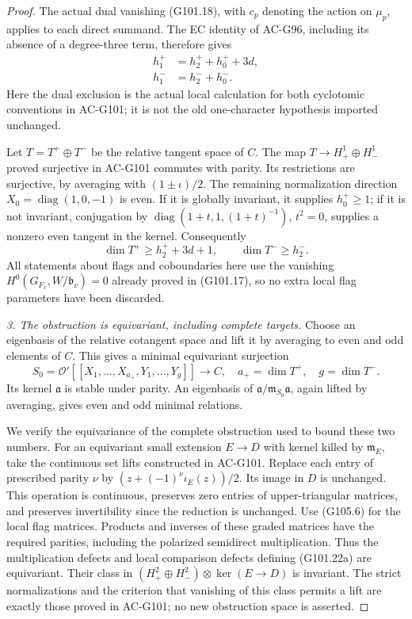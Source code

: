 \begin{proof}
The actual dual vanishing (G101.18), with \(c_p\) denoting
the action on \(\mu_p\), applies to each direct summand.
The EC identity of AC-G96, including its absence of a
degree-three term, therefore gives
\[
 \begin{split}
 h_1^+&=h_2^++h_0^++3d,\\
 h_1^-&=h_2^-+h_0^-.
 \end{split}
 \tag{G105.8}
\]
Here the dual exclusion is the actual local calculation for
both cyclotomic conventions in AC-G101; it is not the old
one-character hypothesis imported unchanged.

Let \(T=T^+\oplus T^-\) be the relative tangent space of
\(C\).  The map \(T\to H^1_+\oplus H^1_-\) proved
surjective in AC-G101 commutes with parity.  Its restrictions
are surjective, by averaging with \((1\pm\iota)/2\).
The remaining normalization direction
\(X_0=\operatorname{diag}(1,0,-1)\) is even.  If it is
globally invariant, it supplies \(h_0^+\ge1\); if it is
not invariant, conjugation by
\(\operatorname{diag}(1+t,1,(1+t)^{-1})\), \(t^2=0\),
supplies a nonzero even tangent in the kernel.  Consequently
\[
 \dim T^+\ge h_2^++3d+1,
 \qquad \dim T^-\ge h_2^-.
 \tag{G105.9}
\]
All statements about flags and coboundaries here use the
vanishing \(H^0(G_{F_v},W/\mathfrak b_v)=0\) already
proved in (G101.17), so no extra local flag parameters have
been discarded.

\emph{3. The obstruction is equivariant, including complete targets.}
Choose an eigenbasis of the relative cotangent space and lift
it by averaging to even and odd elements of \(C\).  This
gives a minimal equivariant surjection
\[
 S_0=\mathcal O'[[X_1,\ldots,X_{a_+},Y_1,\ldots,Y_g]]
       \longrightarrow C,
 \quad a_+=\dim T^+,\quad g=\dim T^-.
 \tag{G105.10}
\]
Its kernel \(\mathfrak a\) is stable under parity.
An eigenbasis of \(\mathfrak a/\mathfrak m_{S_0}\mathfrak a\),
again lifted by averaging, gives even and odd minimal relations.

We verify the equivariance of the complete obstruction used
to bound these two numbers.  For an equivariant small extension
\(E\to D\) with kernel killed by \(\mathfrak m_E\), take
the continuous set lifts constructed in AC-G101.  Replace
each entry of prescribed parity \(\nu\) by
\((z+(-1)^\nu\iota_E(z))/2\).  Its image in \(D\) is
unchanged.  This operation is continuous, preserves zero
entries of upper-triangular matrices, and preserves
invertibility since the reduction is unchanged.  Use (G105.6)
for the local flag matrices.  Products and inverses of these
graded matrices have the required parities, including the
polarized semidirect multiplication.  Thus the multiplication
defects and local comparison defects defining (G101.22a)
are equivariant.  Their class in
\((H^2_+\oplus H^2_-)\otimes\ker(E\to D)\) is invariant.
The strict normalizations and the criterion that vanishing
of this class permits a lift are exactly those proved in
AC-G101; no new obstruction space is asserted.


\end{proof}
